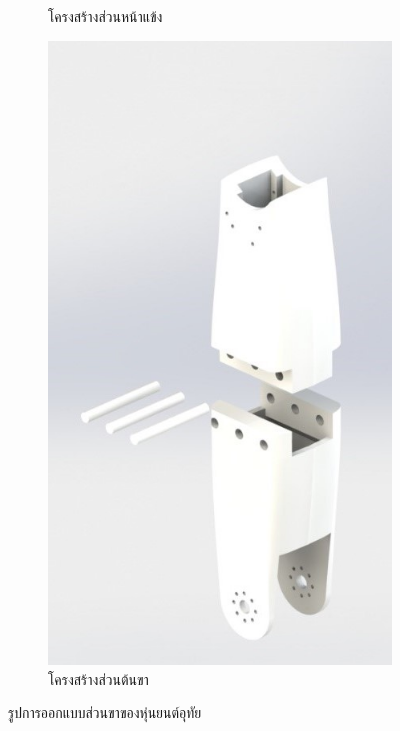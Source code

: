 \begin{figure}[!ht]
\begin{subfigure}[b]{0.3\linewidth}
      \caption{โครงสร้างส่วนหน้าแข้ง}
    \end{subfigure}
    \begin{subfigure}[b]{0.35\linewidth}
      \includegraphics[width=\linewidth]{chapter4/images/thigh.jpg}
      \caption{โครงสร้างส่วนต้นขา}
    \end{subfigure}
    \caption{รูปการออกแบบส่วนขาของหุ่นยนต์อุทัย}
    \label{fig:leg}
  \end{figure}

